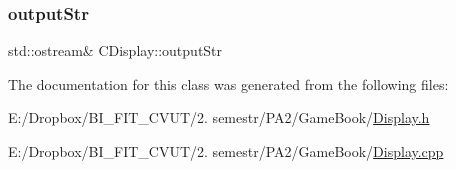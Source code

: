 \subsubsection{\texorpdfstring{output\+Str}{outputStr}}
{\footnotesize\ttfamily std\+::ostream\& C\+Display\+::output\+Str\hspace{0.3cm}{\ttfamily [protected]}}



The documentation for this class was generated from the following files\+:\begin{DoxyCompactItemize}
\item 
E\+:/\+Dropbox/\+B\+I\+\_\+\+F\+I\+T\+\_\+\+C\+V\+U\+T/2. semestr/\+P\+A2/\+Game\+Book/\mbox{\hyperlink{_display_8h}{Display.\+h}}\item 
E\+:/\+Dropbox/\+B\+I\+\_\+\+F\+I\+T\+\_\+\+C\+V\+U\+T/2. semestr/\+P\+A2/\+Game\+Book/\mbox{\hyperlink{_display_8cpp}{Display.\+cpp}}\end{DoxyCompactItemize}
